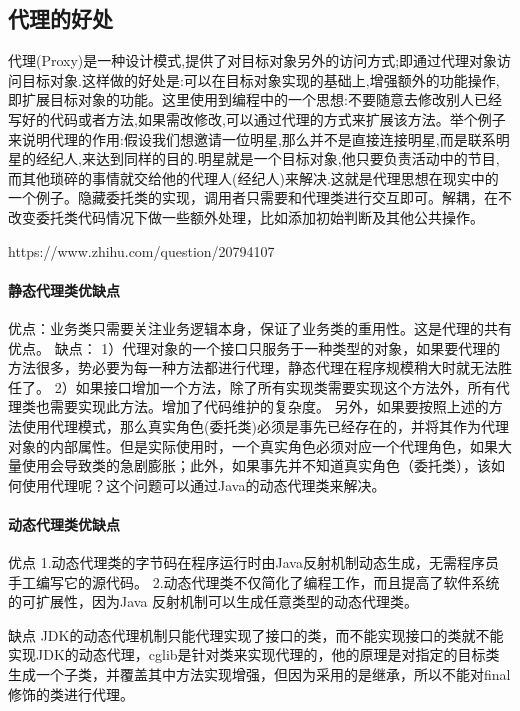 \documentclass[../../../interview-questions.tex]{subfiles}
\begin{document}
\subsection{代理的好处}

代理(Proxy)是一种设计模式,提供了对目标对象另外的访问方式;即通过代理对象访问目标对象.这样做的好处是:可以在目标对象实现的基础上,增强额外的功能操作,即扩展目标对象的功能。这里使用到编程中的一个思想:不要随意去修改别人已经写好的代码或者方法,如果需改修改,可以通过代理的方式来扩展该方法。举个例子来说明代理的作用:假设我们想邀请一位明星,那么并不是直接连接明星,而是联系明星的经纪人,来达到同样的目的.明星就是一个目标对象,他只要负责活动中的节目,而其他琐碎的事情就交给他的代理人(经纪人)来解决.这就是代理思想在现实中的一个例子。隐藏委托类的实现，调用者只需要和代理类进行交互即可。解耦，在不改变委托类代码情况下做一些额外处理，比如添加初始判断及其他公共操作。

https://www.zhihu.com/question/20794107

\paragraph{静态代理类优缺点}

优点：业务类只需要关注业务逻辑本身，保证了业务类的重用性。这是代理的共有优点。
缺点：
1）代理对象的一个接口只服务于一种类型的对象，如果要代理的方法很多，势必要为每一种方法都进行代理，静态代理在程序规模稍大时就无法胜任了。
2）如果接口增加一个方法，除了所有实现类需要实现这个方法外，所有代理类也需要实现此方法。增加了代码维护的复杂度。
另外，如果要按照上述的方法使用代理模式，那么真实角色(委托类)必须是事先已经存在的，并将其作为代理对象的内部属性。但是实际使用时，一个真实角色必须对应一个代理角色，如果大量使用会导致类的急剧膨胀；此外，如果事先并不知道真实角色（委托类），该如何使用代理呢？这个问题可以通过Java的动态代理类来解决。

\paragraph{动态代理类优缺点}

优点
1.动态代理类的字节码在程序运行时由Java反射机制动态生成，无需程序员手工编写它的源代码。
2.动态代理类不仅简化了编程工作，而且提高了软件系统的可扩展性，因为Java 反射机制可以生成任意类型的动态代理类。

缺点
JDK的动态代理机制只能代理实现了接口的类，而不能实现接口的类就不能实现JDK的动态代理，cglib是针对类来实现代理的，他的原理是对指定的目标类生成一个子类，并覆盖其中方法实现增强，但因为采用的是继承，所以不能对final修饰的类进行代理。
\end{document}
